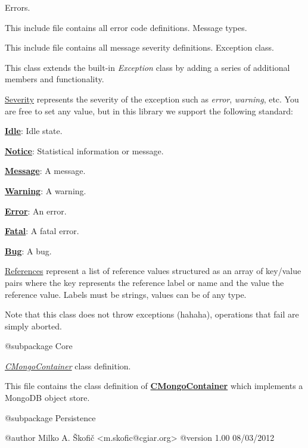 Errors.

This include file contains all error code definitions. Message types.

This include file contains all message severity definitions. Exception class.

This class extends the built-\/in {\itshape Exception\/} class by adding a series of additional members and functionality.

\hyperlink{}{Severity} represents the severity of the exception such as {\itshape error\/}, {\itshape warning\/}, etc. You are free to set any value, but in this library we support the following standard\-: 
\begin{DoxyItemize}
\item {\bfseries \hyperlink{}{Idle}}\-: Idle state. 
\item {\bfseries \hyperlink{}{Notice}}\-: Statistical information or message. 
\item {\bfseries \hyperlink{}{Message}}\-: A message. 
\item {\bfseries \hyperlink{}{Warning}}\-: A warning. 
\item {\bfseries \hyperlink{}{Error}}\-: An error. 
\item {\bfseries \hyperlink{}{Fatal}}\-: A fatal error. 
\item {\bfseries \hyperlink{}{Bug}}\-: A bug. 
\end{DoxyItemize}

\hyperlink{}{References} represent a list of reference values structured as an array of key/value pairs where the key represents the reference label or name and the value the reference value. Labels must be strings, values can be of any type.

Note that this class does not throw exceptions (hahaha), operations that fail are simply aborted.

\begin{DoxyVerb}    @subpackage     Core\end{DoxyVerb}


{\itshape \hyperlink{class_c_mongo_container}{C\-Mongo\-Container}\/} class definition.

This file contains the class definition of {\bfseries \hyperlink{class_c_mongo_container}{C\-Mongo\-Container}} which implements a Mongo\-D\-B object store.

\begin{DoxyVerb}    @subpackage     Persistence

    @author         Milko A. Škofič <m.skofic@cgiar.org>
    @version        1.00 08/03/2012\end{DoxyVerb}


